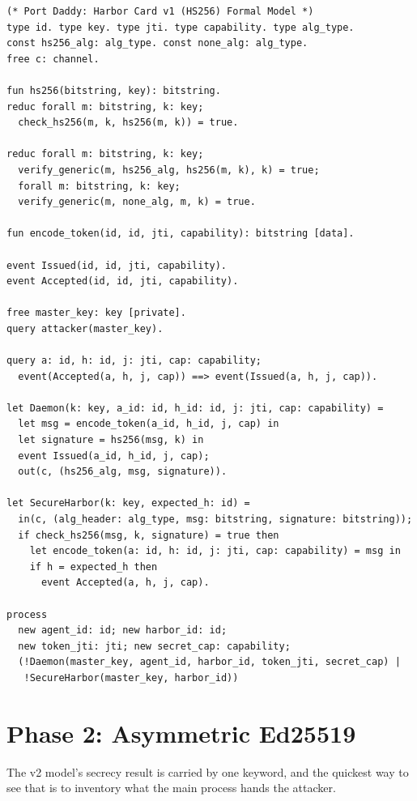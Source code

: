 \documentclass[11pt,a4paper]{article}
\theoremstyle{definition}
\begin{document}
\begin{lstlisting}[caption={\texttt{harbor\_card\_v1\_refined.pv}}]
(* Port Daddy: Harbor Card v1 (HS256) Formal Model *)
type id. type key. type jti. type capability. type alg_type.
const hs256_alg: alg_type. const none_alg: alg_type.
free c: channel.

fun hs256(bitstring, key): bitstring.
reduc forall m: bitstring, k: key; 
  check_hs256(m, k, hs256(m, k)) = true.

reduc forall m: bitstring, k: key; 
  verify_generic(m, hs256_alg, hs256(m, k), k) = true;
  forall m: bitstring, k: key; 
  verify_generic(m, none_alg, m, k) = true.

fun encode_token(id, id, jti, capability): bitstring [data].

event Issued(id, id, jti, capability).
event Accepted(id, id, jti, capability).

free master_key: key [private].
query attacker(master_key).

query a: id, h: id, j: jti, cap: capability;
  event(Accepted(a, h, j, cap)) ==> event(Issued(a, h, j, cap)).

let Daemon(k: key, a_id: id, h_id: id, j: jti, cap: capability) =
  let msg = encode_token(a_id, h_id, j, cap) in
  let signature = hs256(msg, k) in
  event Issued(a_id, h_id, j, cap);
  out(c, (hs256_alg, msg, signature)).

let SecureHarbor(k: key, expected_h: id) =
  in(c, (alg_header: alg_type, msg: bitstring, signature: bitstring));
  if check_hs256(msg, k, signature) = true then
    let encode_token(a: id, h: id, j: jti, cap: capability) = msg in
    if h = expected_h then
      event Accepted(a, h, j, cap).

process
  new agent_id: id; new harbor_id: id;
  new token_jti: jti; new secret_cap: capability;
  (!Daemon(master_key, agent_id, harbor_id, token_jti, secret_cap) |
   !SecureHarbor(master_key, harbor_id))
\end{lstlisting}

\section{Phase 2: Asymmetric Ed25519}\label{app:phase2}

The v2 model's secrecy result is carried by one keyword, and the quickest way to see that is to inventory what the main process hands the attacker.
\end{document}
